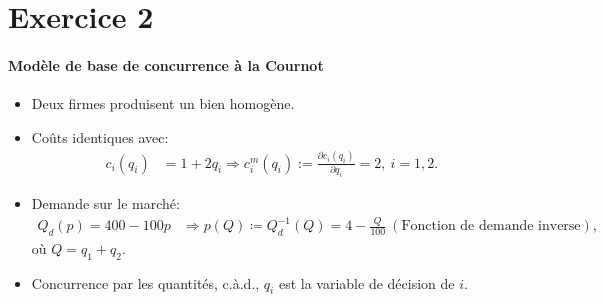 \section{Exercice 2}
\frame{\sectionpage}
\begin{frame}[allowframebreaks]{\insertsection}
\framesubtitle{Modèle de base de concurrence à la Cournot}
\begin{itemize}
\item Deux firmes produisent un bien homogène. 
\item Coûts identiques avec: 
\begin{align}
    c_i(q_i) &= 1 + 2q_i \Rightarrow c_i^m(q_i):=\frac{\partial c_i(q_i)}{\partial q_i}= 2, \ i=1, 2.
    \label{eq1}
\end{align}
\item Demande sur le marché: 
\begin{align}
Q_d(p) = 400 - 100p &\Rightarrow p(Q) \coloneqq Q_d^{-1}(Q)= 4-\frac{Q}{100} \ (\text{Fonction de demande inverse}),
    \label{eq2}
\end{align}
où $Q=q_1+q_2$.
\item Concurrence par les quantités, c.à.d., $q_i$ est la variable de décision de $i$.
\end{itemize}
\end{frame}


